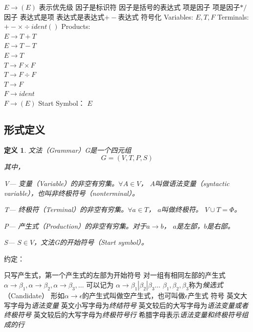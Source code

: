 \documentclass{ctexart}
\newtheorem{definition}{定义}[section]
\begin{document}
\begin{outline}
               $E \to (E)$
        \2 表示优先级
            \3 因子是标识符
            \3 因子是括号的表达式
            \3 项是因子
            \3 项是因子$*/$因子
            \3 表达式是项
            \3 表达式是表达式$+-$表达式
        \2 符号化 
            \3 Variables: $E, T, F$
            \3 Terminals: $+ - \times \div ident ( )$
            \3 Products:  \\
                $E \to T + T$ \\
                $E \to T - T$ \\
                $E \to T$ \\
                $T \to F \times F$ \\
                $T \to F \div F$ \\
                $T \to F $ \\
                $F \to ident$ \\
                $F \to (E)$
            \3 Start Symbol： $E$
\end{outline}
\subsection{形式定义}
\begin{definition}
    文法（Grammar）G是一个四元组
    $$
        G = (V, T, P, S)
    $$
    其中，

    V--- \emph{变量（Variable）}的非空有穷集。$\forall A \in V$，
    $A$叫做语法变量（syntactic variable），也叫非终极符号（nonterminal）。
    
    T--- \emph{终极符（Terminal）}的非空有穷集。$\forall a \in T$，
    $a$叫做终极符。 $V \cup T = \Phi$。

    P--- \emph{产生式（Production）}的非空有穷集。对于$a \to b$，
    $a$是\emph{左部}，$b$是\emph{右部}。

    S--- $S \in V$，文法G的\emph{开始符号（Start symbol）}。
\end{definition}

约定：
\begin{outline}
    \1 只写产生式，第一个产生式的左部为开始符号
    \1 对一组有相同左部的产生式 \\
        $\alpha \to \beta_1, \alpha \to \beta_2, \alpha \to \beta_3, \dots$
        可以记为 $\alpha \to \beta_1 | \beta_2 | \beta_3 \dots$
        $\beta_1 , \beta_2 , \beta_3$称为\emph{候选式}（Candidate）
    \1 形如$\alpha \to \epsilon$的产生式叫做空产生式，也可叫做$\epsilon$产生式
    \1 符号
        \2 英文大写字母为\emph{语法变量}
        \2 英文小写字母为\emph{终结符号}
        \2 英文较后的大写字母为\emph{语法变量或者终极符号}
        \2 英文较后的大写字母为\emph{终极符号行}
        \2 希腊字母表示\emph{语法变量和终极符号组成的行}
\end{outline}
\end{document}
